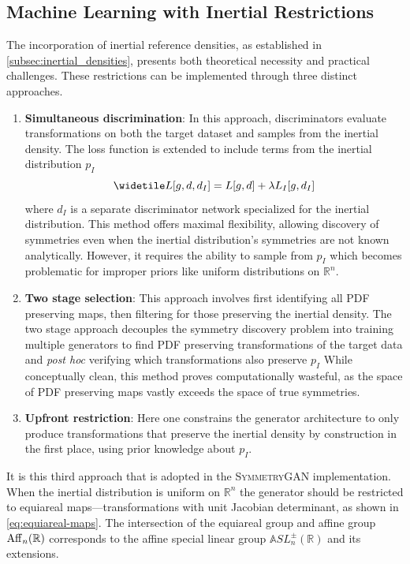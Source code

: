     \subsection{Machine Learning with Inertial Restrictions}
    The incorporation of inertial reference densities, as established in \cref{subsec:inertial_densities}, presents both theoretical necessity and practical challenges.
    These restrictions can be implemented through three distinct approaches.
    \begin{enumerate}
        \item \textbf{Simultaneous discrimination}:
            In this approach, discriminators evaluate transformations on both the target dataset and samples from the inertial density.
            The loss function is extended to include terms from the inertial distribution \(p_I\)
            \[
                \widetile L[g,d,d_I] = L[g,d] + \lambda L_I[g,d_I]
            \]
            where \(d_I\) is a separate discriminator network specialized for the inertial distribution.
            This method offers maximal flexibility, allowing discovery of symmetries even when the inertial distribution's symmetries are not known analytically.
            However, it requires the ability to sample from \(p_I\) which becomes problematic for improper priors like uniform distributions on \(\mathbb{R}^n\).
        \item \textbf{Two stage selection}:
            This approach involves first identifying all PDF preserving maps, then filtering for those preserving the inertial density.
            The two stage approach decouples the symmetry discovery problem into training multiple generators to find PDF preserving transformations of the target data and \textit{post hoc} verifying which transformations also preserve \(p_I\)
            While conceptually clean, this method proves computationally wasteful, as the space of PDF preserving maps vastly exceeds the space of true symmetries.
        \item \textbf{Upfront restriction}:
            Here one constrains the generator architecture to only produce transformations that preserve the inertial density by construction in the first place, using prior knowledge about \(p_I\).
    \end{enumerate}
    
    It is this third approach that is adopted in the \textsc{SymmetryGAN} implementation.
    When the inertial distribution is uniform on \(\mathbb{R}^n\) the generator should be restricted to equiareal maps---transformations with unit Jacobian determinant, as shown in \cref{eq:equiareal-maps}.
    The intersection of the equiareal group and affine group \(\operatorname{Aff}_n(\mathbb{R})\) corresponds to the affine special linear group \(\mathbb{A}SL^\pm_n(\mathbb{R})\) and its extensions.

